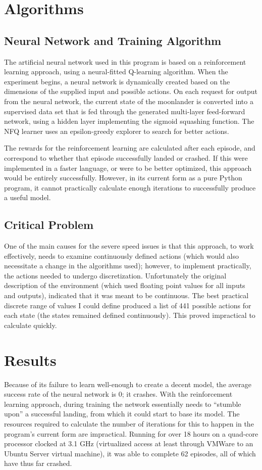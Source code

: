 \documentclass[12pt, article]{scrartcl}
\begin{document}
\section{Algorithms}
\subsection{Neural Network and Training Algorithm}
The artificial neural network used in this program is based on a reinforcement learning approach, using a neural-fitted Q-learning algorithm. When the experiment begins, a neural network is dynamically created based on the dimensions of the supplied input and possible actions. On each request for output from the neural network, the current state of the moonlander is converted into a supervised data set that is fed through the generated multi-layer feed-forward network, using a hidden layer implementing the sigmoid squashing function. The NFQ learner uses an epsilon-greedy explorer to search for better actions.

The rewards for the reinforcement learning are calculated after each episode, and correspond to whether that episode successfully landed or crashed. If this were implemented in a faster language, or were to be better optimized, this approach would be entirely successfully. However, in its current form as a pure Python program, it cannot practically calculate enough iterations to successfully produce a useful model. 

\subsection{Critical Problem}
One of the main causes for the severe speed issues is that this approach, to work effectively, needs to examine continuously defined actions (which would also necessitate a change in the algorithms used); however, to implement practically, the actions needed to undergo discretization. Unfortunately the original description of the environment (which used floating point values for all inputs and outputs), indicated that it was meant to be continuous. The best practical discrete range of values I could define produced a list of 441 possible actions for each state (the states remained defined continuously). This proved impractical to calculate quickly.

\section{Results}
Because of its failure to learn well-enough to create a decent model, the average success rate of the neural network is 0; it crashes. With the reinforcement learning approach, during training the network essentially needs to ``stumble upon'' a successful landing, from which it could start to base its model. The resources required to calculate the number of iterations for this to happen in the program's current form are impractical. Running for over 18 hours on a quad-core processor clocked at 3.1 GHz (virtualized access at least through VMWare to an Ubuntu Server virtual machine), it was able to complete 62 episodes, all of which have thus far crashed.
\end{document}

